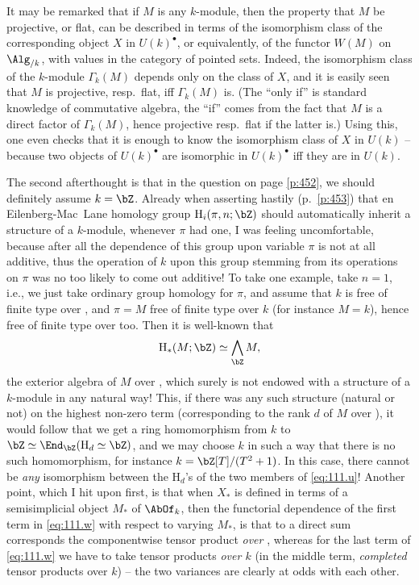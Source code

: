 It may be remarked that if $M$ is any $k$-module, then the
property that $M$ be projective, or flat, can be described in terms of
the isomorphism class of the corresponding object $X$ in
$U(k)^\bullet$, or equivalently, of the functor $W(M)$ on $\Alg_{/k}$,
with values in the category of pointed sets. Indeed, the isomorphism
class of the $k$-module $\Gamma_k(M)$ depends only on the class of
$X$, and it is easily seen that $M$ is projective, resp.\ flat, if{f}
$\Gamma_k(M)$ is. (The ``only if'' is standard knowledge of
commutative algebra, the ``if'' comes from the fact that $M$ is a
direct factor of $\Gamma_k(M)$, hence projective resp.\ flat if the
latter is.) Using this, one even checks that it is enough to know the
isomorphism class of $X$ in $U(k)$ -- because two objects of
$U(k)^\bullet$ are isomorphic in $U(k)^\bullet$ if{f} they are in
$U(k)$.

\starsbreak

The second afterthought is that in the question on page \ref{p:452},
we should definitely assume $k=\bZ$. Already when asserting hastily
(p.\ \ref{p:453}) that en Eilenberg-Mac~Lane homology group $\mathrm
H_i(\pi,n;\bZ)$ should automatically inherit a structure of a
$k$-module, whenever $\pi$ had one, I was feeling uncomfortable,
because after all the dependence of this group upon variable $\pi$ is
not at all additive, thus the operation of $k$ upon this group
stemming from its operations on $\pi$ was no too likely to come out
additive! To take one example, take $n=1$, i.e., we just take ordinary
group homology for $\pi$, and assume that $k$ is free of finite type
over \bZ, and $\pi=M$ free of finite type over $k$ (for instance
$M=k$), hence free of finite type over \bZ{} too. Then it is
well-known that
\[\mathrm H_*(M; \bZ) \simeq \bigwedge_\bZ M,\]
the exterior algebra of $M$ over \bZ, which surely is not endowed with
a structure of a $k$-module in any natural way! This, if there was any
such structure (natural or not) on the highest non-zero term
(corresponding to the rank $d$ of $M$ over \bZ), it would follow that
we get a ring homomorphism from $k$ to $\bZ\simeq\End_\bZ(\mathrm
H_d\simeq\bZ)$, and we may choose $k$ in such a way that there is no
such homomorphism, for instance $k=\bZ[T]/(T^2+1)$. In this case,
there cannot be \emph{any} isomorphism between the $\mathrm H_d$'s of
the two members of \eqref{eq:111.u}! Another point, which I hit upon
first, is that when $X_*$ is defined in terms of a semisimplicial
object $M_*$ of $\AbOf_k$, then the functorial dependence of the first
term in \eqref{eq:111.w} with respect to varying $M_*$, is
that to a direct sum corresponds the componentwise tensor product
\emph{over \bZ}, whereas for the last term of \eqref{eq:111.w} we have
to take tensor products \emph{over $k$} (in the middle term,
\emph{completed} tensor products over $k$) -- the two variances are
clearly at odds with each other.

